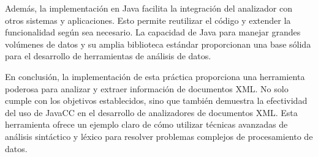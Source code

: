 Además, la implementación en Java facilita la integración del analizador con otros sistemas y aplicaciones. Esto permite reutilizar el código y extender la funcionalidad según sea necesario. La capacidad de Java para manejar grandes volúmenes de datos y su amplia biblioteca estándar proporcionan una base sólida para el desarrollo de herramientas de análisis de datos.

En conclusión, la implementación de esta práctica proporciona una herramienta poderosa para analizar y extraer información de documentos XML. No solo cumple con los objetivos establecidos, sino que también demuestra la efectividad del uso de JavaCC en el desarrollo de analizadores de documentos XML. Esta herramienta ofrece un ejemplo claro de cómo utilizar técnicas avanzadas de análisis sintáctico y léxico para resolver problemas complejos de procesamiento de datos.







